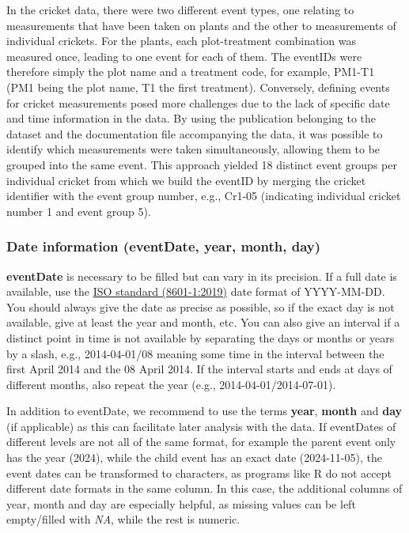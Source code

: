 \documentclass[
]{book}
\begin{document}
In the cricket data, there were two different event types, one relating to measurements that have been taken on plants and the other to measurements of individual crickets. For the plants, each plot-treatment combination was measured once, leading to one event for each of them. The eventIDs were therefore simply the plot name and a treatment code, for example, PM1-T1 (PM1 being the plot name, T1 the first treatment). Conversely, defining events for cricket measurements posed more challenges due to the lack of specific date and time information in the data. By using the publication belonging to the dataset and the documentation file accompanying the data, it was possible to identify which measurements were taken simultaneously, allowing them to be grouped into the same event. This approach yielded 18 distinct event groups per individual cricket from which we build the eventID by merging the cricket identifier with the event group number, e.g., Cr1-05 (indicating individual cricket number 1 and event group 5).

\hypertarget{date-information-eventdate-year-month-day}{%
\subsubsection{Date information (eventDate, year, month, day)}\label{date-information-eventdate-year-month-day}}

\textbf{eventDate} is necessary to be filled but can vary in its precision. If a full date is available, use the \href{https://www.iso.org/obp/ui/en/\#iso:std:iso:8601:-1:ed-1:v1:en}{ISO standard (8601-1:2019)} date format of YYYY-MM-DD. You should always give the date as precise as possible, so if the exact day is not available, give at least the year and month, etc. You can also give an interval if a distinct point in time is not available by separating the days or months or years by a slash, e.g., 2014-04-01/08 meaning some time in the interval between the first April 2014 and the 08 April 2014. If the interval starts and ends at days of different months, also repeat the year (e.g., 2014-04-01/2014-07-01).

In addition to eventDate, we recommend to use the terms \textbf{year}, \textbf{month} and \textbf{day} (if applicable) as this can facilitate later analysis with the data. If eventDates of different levels are not all of the same format, for example the parent event only has the year (2024), while the child event has an exact date (2024-11-05), the event dates can be transformed to characters, as programs like R do not accept different date formats in the same column. In this case, the additional columns of year, month and day are especially helpful, as missing values can be left empty/filled with \emph{NA}, while the rest is numeric.
\end{document}
